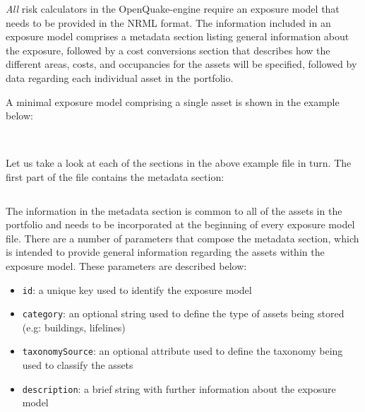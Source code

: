 \emph{All} risk calculators in the OpenQuake-engine require an \gls{exposure
model} that needs to be provided in the NRML format. The information included
in an exposure model comprises a metadata section listing general information
about the exposure, followed by a cost conversions section that describes how
the different areas, costs, and occupancies for the assets will be specified,
followed by data regarding each individual asset in the portfolio.

A minimal exposure model comprising a single asset is shown in the example
below:

\inputminted[firstline=1,firstnumber=1,fontsize=\footnotesize,frame=single,linenos,bgcolor=lightgray]{xml}{oqum/risk/Verbatim/input_exposure_minimal.xml}\\

Let us take a look at each of the sections in the above example file in turn.
The first part of the file contains the metadata section:

\inputminted[firstline=5,firstnumber=5,lastline=8,fontsize=\footnotesize,frame=single,linenos,bgcolor=lightgray]{xml}{oqum/risk/Verbatim/input_exposure_minimal.xml}

The information in the metadata section is common to all of the assets in the
portfolio and needs to be incorporated at the beginning of every exposure
model file. There are a number of parameters that compose the metadata
section, which is intended to provide general information regarding the
\glspl{asset} within the \gls{exposure model}. These parameters are described
below:

\begin{itemize}

    \item \Verb+id+: a unique key used to identify the \gls{exposure model}

    \item \Verb+category+: an optional string used to define the type of
    \glspl{asset} being stored (e.g: buildings, lifelines)

    \item \Verb+taxonomySource+: an optional attribute used to define the
    \gls{taxonomy} being used to classify the \glspl{asset}

    \item \Verb+description+: a brief string with further information about the
    \gls{exposure model}

\end{itemize}


